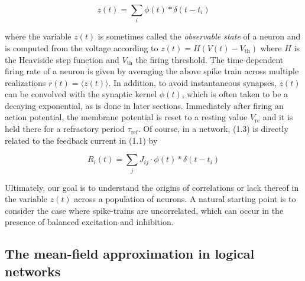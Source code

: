 \documentclass{ucetd}
\begin{document}
\begin{equation}
z(t) = \sum_{i} \phi(t) * \delta(t-t_{i})
\end{equation}

where the variable $z(t)$ is sometimes called the \emph{observable state} of a neuron and is computed from the voltage according to $z(t) = H(V(t) - V_{\mathrm{th}})$ where $H$ is the Heaviside step function and $V_{\mathrm{th}}$ the firing threshold. The time-dependent firing rate of a neuron is given by averaging the above spike train across multiple realizations $r(t) = \langle z(t) \rangle$. In addition, to avoid instantaneous synapses, $z(t)$ can be convolved with the synaptic kernel $\phi(t)$, which is often taken to be a decaying exponential, as is done in later sections. Immediately after firing an action potential, the membrane potential is reset to a resting value $V_{\mathrm{re}}$ and it is held there for a refractory period $\tau_{\mathrm{ref}}$. Of course, in a network, (1.3) is directly related to the feedback current in (1.1) by 

\begin{equation}
R_{i}(t) = \sum_{j} J_{ij}\cdot \phi(t) * \delta(t-t_{i})
\end{equation}

Ultimately, our goal is to understand the origins of correlations or lack thereof in the variable $z(t)$ across a population of neurons. A natural starting point is to consider the case where spike-trains are uncorrelated, which can occur in the presence of balanced excitation and inhibition.

\subsection{The mean-field approximation in logical networks}
\end{document}
